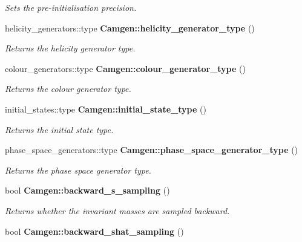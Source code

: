 \begin{DoxyCompactItemize}
\begin{DoxyCompactList}\small\item\em Sets the pre-\/initialisation precision. \end{DoxyCompactList}\item 
\hypertarget{a00849_a85645287db586b6dc0c30ae712d8089f}{helicity\-\_\-generators\-::type {\bfseries Camgen\-::helicity\-\_\-generator\-\_\-type} ()}\label{a00849_a85645287db586b6dc0c30ae712d8089f}

\begin{DoxyCompactList}\small\item\em Returns the helicity generator type. \end{DoxyCompactList}\item 
\hypertarget{a00849_aadb35b3258ed02ac23e9bceb092cf617}{colour\-\_\-generators\-::type {\bfseries Camgen\-::colour\-\_\-generator\-\_\-type} ()}\label{a00849_aadb35b3258ed02ac23e9bceb092cf617}

\begin{DoxyCompactList}\small\item\em Returns the colour generator type. \end{DoxyCompactList}\item 
\hypertarget{a00849_a0691af5b6af1f99a786fe45da43dd80b}{initial\-\_\-states\-::type {\bfseries Camgen\-::initial\-\_\-state\-\_\-type} ()}\label{a00849_a0691af5b6af1f99a786fe45da43dd80b}

\begin{DoxyCompactList}\small\item\em Returns the initial state type. \end{DoxyCompactList}\item 
\hypertarget{a00849_add0039ba62eccad4ce500a7d14205ce0}{phase\-\_\-space\-\_\-generators\-::type {\bfseries Camgen\-::phase\-\_\-space\-\_\-generator\-\_\-type} ()}\label{a00849_add0039ba62eccad4ce500a7d14205ce0}

\begin{DoxyCompactList}\small\item\em Returns the phase space generator type. \end{DoxyCompactList}\item 
\hypertarget{a00849_a2f56b600196d9e593d244563d9699ea7}{bool {\bfseries Camgen\-::backward\-\_\-s\-\_\-sampling} ()}\label{a00849_a2f56b600196d9e593d244563d9699ea7}

\begin{DoxyCompactList}\small\item\em Returns whether the invariant masses are sampled backward. \end{DoxyCompactList}\item 
\hypertarget{a00849_a597636ede67b7edd2a7802d8619303cd}{bool {\bfseries Camgen\-::backward\-\_\-shat\-\_\-sampling} ()}\label{a00849_a597636ede67b7edd2a7802d8619303cd}


\end{DoxyCompactItemize}

